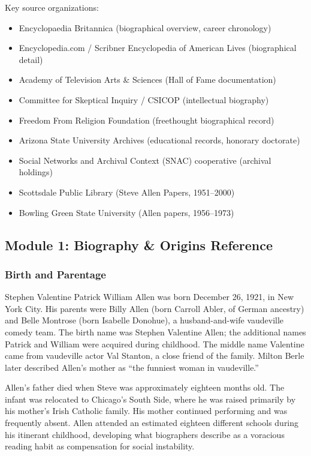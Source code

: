 \documentclass[11pt,letterpaper]{article}
\begin{document}
Key source organizations:
\begin{itemize}[leftmargin=2em]
\item Encyclopaedia Britannica (biographical overview, career chronology)
\item Encyclopedia.com / Scribner Encyclopedia of American Lives (biographical detail)
\item Academy of Television Arts \& Sciences (Hall of Fame documentation)
\item Committee for Skeptical Inquiry / CSICOP (intellectual biography)
\item Freedom From Religion Foundation (freethought biographical record)
\item Arizona State University Archives (educational records, honorary doctorate)
\item Social Networks and Archival Context (SNAC) cooperative (archival holdings)
\item Scottsdale Public Library (Steve Allen Papers, 1951--2000)
\item Bowling Green State University (Allen papers, 1956--1973)
\end{itemize}

\subsection{Module 1: Biography \& Origins Reference}

\subsubsection{Birth and Parentage}

Stephen Valentine Patrick William Allen was born December 26, 1921, in New York City. His parents were Billy Allen (born Carroll Abler, of German ancestry) and Belle Montrose (born Isabelle Donohue), a husband-and-wife vaudeville comedy team. The birth name was Stephen Valentine Allen; the additional names Patrick and William were acquired during childhood. The middle name Valentine came from vaudeville actor Val Stanton, a close friend of the family. Milton Berle later described Allen's mother as ``the funniest woman in vaudeville.''

Allen's father died when Steve was approximately eighteen months old. The infant was relocated to Chicago's South Side, where he was raised primarily by his mother's Irish Catholic family. His mother continued performing and was frequently absent. Allen attended an estimated eighteen different schools during his itinerant childhood, developing what biographers describe as a voracious reading habit as compensation for social instability.
\end{document}
